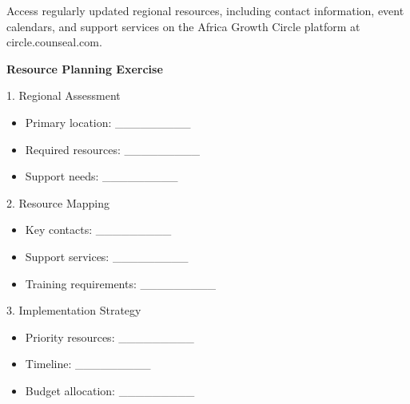 \vspace{1em}

\begin{communitybox}
    Access regularly updated regional resources, including contact information, event calendars, and support services on the Africa Growth Circle platform at circle.counseal.com.
\end{communitybox}

\vspace{1em}

\begin{workshopbox}
    \textbf{Resource Planning Exercise}

    1. Regional Assessment
    \begin{itemize}[leftmargin=*]
        \item Primary location: \_\_\_\_\_\_\_\_\_
        \item Required resources: \_\_\_\_\_\_\_\_\_
        \item Support needs: \_\_\_\_\_\_\_\_\_
    \end{itemize}

    2. Resource Mapping
    \begin{itemize}[leftmargin=*]
        \item Key contacts: \_\_\_\_\_\_\_\_\_
        \item Support services: \_\_\_\_\_\_\_\_\_
        \item Training requirements: \_\_\_\_\_\_\_\_\_
    \end{itemize}

    3. Implementation Strategy
    \begin{itemize}[leftmargin=*]
        \item Priority resources: \_\_\_\_\_\_\_\_\_
        \item Timeline: \_\_\_\_\_\_\_\_\_
        \item Budget allocation: \_\_\_\_\_\_\_\_\_
    \end{itemize}
\end{workshopbox}